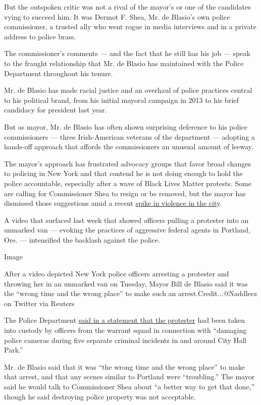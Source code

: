 But the outspoken critic was not a rival of the mayor's or one of the
candidates vying to succeed him. It was Dermot F. Shea, Mr. de Blasio's
own police commissioner, a trusted ally who went rogue in media
interviews and in a private address to police brass.

The commissioner's comments --- and the fact that he still has his job
--- speak to the fraught relationship that Mr. de Blasio has maintained
with the Police Department throughout his tenure.

Mr. de Blasio has made racial justice and an overhaul of police
practices central to his political brand, from his initial mayoral
campaign in 2013 to his brief candidacy for president last year.

But as mayor, Mr. de Blasio has often shown surprising deference to his
police commissioners --- three Irish-American veterans of the department
--- adopting a hands-off approach that affords the commissioners an
unusual amount of leeway.

The mayor's approach has frustrated advocacy groups that favor broad
changes to policing in New York and that contend he is not doing enough
to hold the police accountable, especially after a wave of Black Lives
Matter protests. Some are calling for Commissioner Shea to resign or be
removed, but the mayor has dismissed those suggestions amid a recent
\href{https://www.nytimes3xbfgragh.onion/2020/07/16/nyregion/nyc-shootings-nypd.html}{spike
in violence in the city}.

A video that surfaced last week that showed officers pulling a protester
into an unmarked van --- evoking the practices of aggressive federal
agents in Portland, Ore. --- intensified the backlash against the
police.

Image

After a video depicted New York police officers arresting a protester
and throwing her in an unmarked van on Tuesday, Mayor Bill de Blasio
said it was the ``wrong time and the wrong place'' to make such an
arrest.Credit...@Naddleez on Twitter via Reuters

The Police Department
\href{https://twitter.com/NYPDnews/status/1288270680614739968}{said in a
statement that the protester} had been taken into custody by officers
from the warrant squad in connection with ``damaging police cameras
during five separate criminal incidents in and around City Hall Park.''

Mr. de Blasio said that it was ``the wrong time and the wrong place'' to
make that arrest, and that any scenes similar to Portland were
``troubling.'' The mayor said he would talk to Commissioner Shea about
``a better way to get that done,'' though he said destroying police
property was not acceptable.

